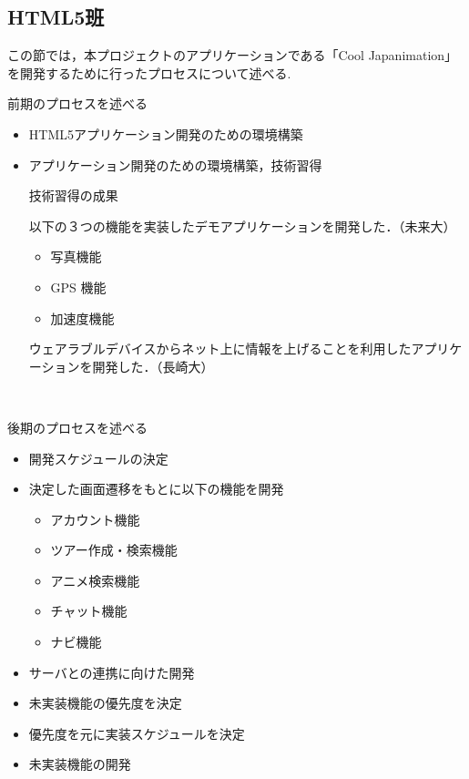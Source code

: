 \subsection{HTML5班}
\par この節では，本プロジェクトのアプリケーションである「Cool Japanimation」を開発するために行ったプロセスについて述べる.

\par 前期のプロセスを述べる

\begin{itemize}
\item HTML5アプリケーション開発のための環境構築
\item アプリケーション開発のための環境構築，技術習得

\par 技術習得の成果

\par 以下の３つの機能を実装したデモアプリケーションを開発した．（未来大）
\begin{itemize}
\item 写真機能
\item GPS 機能
\item 加速度機能
\end{itemize}

\par ウェアラブルデバイスからネット上に情報を上げることを利用したアプリケーションを開発した．（長崎大）
\end{itemize}

\\
\par 後期のプロセスを述べる

\begin{itemize}
\item 開発スケジュールの決定
\item 決定した画面遷移をもとに以下の機能を開発
\begin{itemize}
\item アカウント機能
\item ツアー作成・検索機能
\item アニメ検索機能
\item チャット機能
\item ナビ機能
\end{itemize}
\item サーバとの連携に向けた開発
\item 未実装機能の優先度を決定
\item 優先度を元に実装スケジュールを決定
\item 未実装機能の開発
\end{itemize}

